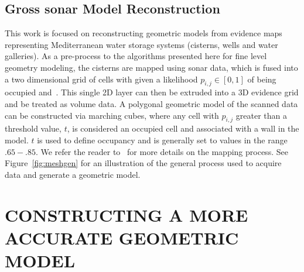 \documentclass[a4paper,twoside]{article}
\begin{document}
\subsection{{Gross sonar Model Reconstruction}}
\label{sec:reconstruction}

\begin{figure*}[ht!]
   \vspace{-0.2cm}
   \caption{How we generate meshes from sonar models.}
  \label{fig:meshgen}
 \end{figure*}
 
\noindent This work is focused on reconstructing geometric models from evidence maps representing Mediterranean water storage systems (cisterns, wells and water galleries).  As a pre-process to the algorithms presented here for fine level geometry modeling, the cisterns are mapped using sonar data, which is fused into a two dimensional grid of cells with given a likelihood $p_{i,j} \in [0,1]$ of being occupied \cite{Thrun2005} and~\cite{White10}. This single 2D layer can then be extruded into a 3D evidence grid and be treated as volume data.  A polygonal geometric model of the scanned data can be constructed via marching cubes, where any cell with $p_{i,j}$ greater than a threshold value, $t$, is considered an occupied cell and associated with a wall in the model. $t$ is used to define occupancy and is generally set to values in the range $.65-.85$. We refer the reader to~\cite{ICEX11,McVicker,McVicker2} for more details on the mapping process. See Figure~\ref{fig:meshgen} for an illustration of the general process used to acquire data and generate a geometric model.


\section{\uppercase{Constructing a more accurate geometric model}}
\label{sec:detail}
\end{document}
